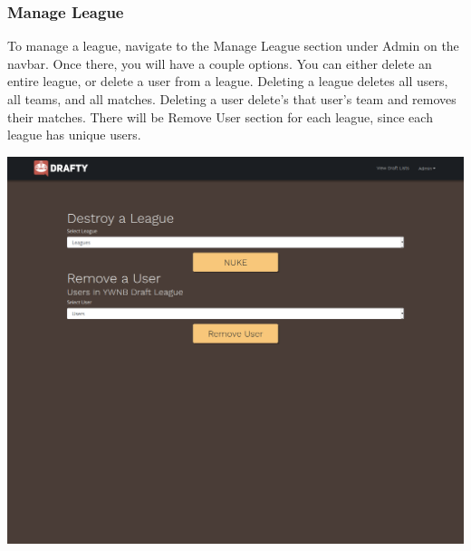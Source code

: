 \documentclass{article}
\begin{document}
  \subsubsection*{Manage League}
  To manage a league, navigate to the Manage League section under Admin on the navbar. Once there, you will have a couple options.
  You can either delete an entire league, or delete a user from a league. Deleting a league deletes all users, all teams, and all matches. 
  Deleting a user delete's that user's team and removes their matches.
  There will be Remove User section for each league, since each league has unique users. \\
  \begin{center}
    \includegraphics[scale=.3]{manage_league.png}
  \end{center}
\end{document}
